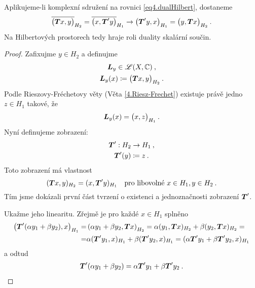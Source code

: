 \begin{remark}
Aplikujeme-li komplexní sdružení na rovnici \eqref{eq4.dualHilbert}, dostaneme \begin{align*}
    \overline{\big( \boldsymbol{T} x, y \big)}_{H_2} = \overline{\big( x, \boldsymbol{T}' y \big)}_{H_1} \rightarrow \big( \boldsymbol{T}' y, x \big)_{H_1} = \big( y, \boldsymbol{T} x \big)_{H_2} \:.
\end{align*}
Na Hilbertových prostorech tedy hraje roli duality skalární součin.
\end{remark}
\begin{proof}
Zafixujme $y \in H_2$ a definujme
\begin{gather*}
    \boldsymbol{L}_y \in \mathscr{L}(X, \mathbb{C}) \: ,\\
    \boldsymbol{L}_y(x) \coloneqq \big( \boldsymbol{T} x, y \big)_{H_2} \: .
\end{gather*}
Podle Rieszovy-Fréchetovy věty (Věta \ref{4.Riesz-Frechet}) existuje právě jedno $z \in H_1$ takové, že \begin{align*}
    \boldsymbol{L}_y(x) = \big( x, z \big)_{H_1} \:.
\end{align*}
Nyní definujeme zobrazení:
\begin{gather*}
    \boldsymbol{T}': H_2 \to H_1 \: ,\\
    \boldsymbol{T}'(y) \coloneqq  z \: .
\end{gather*}
Toto zobrazení má vlastnost
$$
    (\boldsymbol{T} x, y)_{H_2} = (x,\boldsymbol{T}' y)_{H_1} \quad \text{pro libovolné } x\in H_1, y \in H_2 \:.
$$
Tím jsme dokázali první část tvrzení o existenci a jednoznačnosti zobrazení $\boldsymbol{T}'$.

Ukažme jeho linearitu. Zřejmě je pro každé $x \in H_1$ splněno
\begin{align*}
    \left( \boldsymbol{T}' (\alpha y_1 + \beta y_2) , x \right)_{H_1} =& \left( \alpha y_1 + \beta y_2 , \boldsymbol{T} x \right)_{H_2} = \alpha (y_1, \boldsymbol{T} x)_{H_2} + \beta (y_2, \boldsymbol{T} x)_{H_2} = \\
    =&
    \alpha (\boldsymbol{T}' y_1, x)_{H_1} + \beta (\boldsymbol{T}' y_2, x)_{H_1} = (\alpha \boldsymbol{T}' y_1 + \beta \boldsymbol{T}' y_2, x)_{H_1}
\end{align*}
a odtud
\begin{align*}
    \boldsymbol{T}' (\alpha y_1 + \beta y_2) = \alpha \boldsymbol{T}' y_1 + \beta \boldsymbol{T}' y_2 \:.
\end{align*}


\end{proof}
